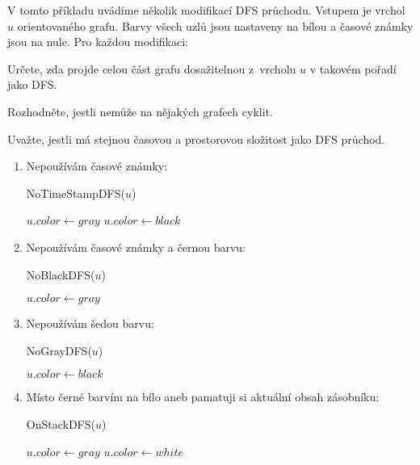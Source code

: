 \documentclass[12pt,a4paper]{extarticle}
\begin{document}
V tomto příkladu uvádíme několik modifikací DFS průchodu. Vstupem je vrchol $u$
orientovaného grafu. Barvy všech uzlů jsou nastaveny na bílou a časové známky
jsou na nule. Pro každou modifikaci:
\begin{compactitem}
	\item Určete, zda projde celou část grafu dosažitelnou z~vrcholu $u$ v takovém pořadí jako DFS.
	\item Rozhodněte, jestli nemůže na nějakých grafech cyklit.
	\item Uvažte, jestli má stejnou časovou a prostorovou složitost jako DFS průchod.
\end{compactitem}

\begin{enumerate}
	\item Nepoužívám časové známky:

	\begin{procedure}[H]
		\caption{NoTimeStampDFS($u$)}
		\BlankLine
		$\mathit{u.color} \leftarrow \mathit{gray}$ \;
		 {
			 {
				 \;
			}
		}
		$\mathit{u.color} \leftarrow \mathit{black}$ \;
	\end{procedure}

	\item Nepoužívám časové známky a černou barvu:
	
	\begin{procedure}[H]
		\caption{NoBlackDFS($u$)}
		\BlankLine
		$\mathit{u.color} \leftarrow \mathit{gray}$ \label{line:nobackdfs_first}\;
		 {
			 { \label{line:nobackdfs_fourth}
				 \;
			}
		}
	\end{procedure}

	\item Nepoužívám šedou barvu:

	\begin{procedure}[H]
		\caption{NoGrayDFS($u$)}
		\BlankLine
		 {
			 {
				 \;
			}
		}
		$\mathit{u.color} \leftarrow \mathit{black}$ \;
	\end{procedure}

	\item Místo černé barvím na bílo aneb pamatuji si aktuální obsah zásobníku:
	
	\begin{procedure}[H]
		\caption{OnStackDFS($u$)}
		\BlankLine
		$\mathit{u.color} \leftarrow \mathit{gray}$ \;
		 {
			 {
				 \;
			}
		}
		$\mathit{u.color} \leftarrow \mathit{white}$ \;
	\end{procedure}


\end{enumerate}
\end{document}
